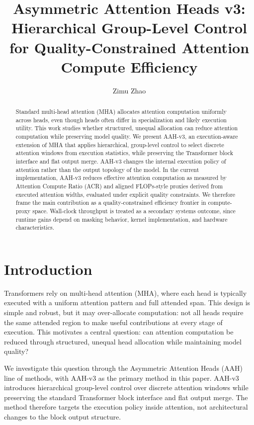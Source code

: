 \documentclass[11pt]{article}
\title{Asymmetric Attention Heads v3: Hierarchical Group-Level Control for Quality-Constrained Attention Compute Efficiency}
\author{Zimu Zhao}
\date{}
\begin{document}
\maketitle



\begin{abstract}
Standard multi-head attention (MHA) allocates attention computation uniformly across heads, even though heads often differ in specialization and likely execution utility. This work studies whether structured, unequal allocation can reduce attention computation while preserving model quality. We present AAH-v3, an execution-aware extension of MHA that applies hierarchical, group-level control to select discrete attention windows from execution statistics, while preserving the Transformer block interface and flat output merge. AAH-v3 changes the internal execution policy of attention rather than the output topology of the model. In the current implementation, AAH-v3 reduces effective attention computation as measured by Attention Compute Ratio (ACR) and aligned FLOPs-style proxies derived from executed attention widths, evaluated under explicit quality constraints. We therefore frame the main contribution as a quality-constrained efficiency frontier in compute-proxy space. Wall-clock throughput is treated as a secondary systems outcome, since runtime gains depend on masking behavior, kernel implementation, and hardware characteristics.


\end{abstract}

\section{Introduction}

Transformers rely on multi-head attention (MHA), where each head is typically executed with a uniform attention pattern and full attended span. This design is simple and robust, but it may over-allocate computation: not all heads require the same attended region to make useful contributions at every stage of execution. This motivates a central question: can attention computation be reduced through structured, unequal head allocation while maintaining model quality?

We investigate this question through the Asymmetric Attention Heads (AAH) line of methods, with AAH-v3 as the primary method in this paper. AAH-v3 introduces hierarchical group-level control over discrete attention windows while preserving the standard Transformer block interface and flat output merge. The method therefore targets the execution policy inside attention, not architectural changes to the block output structure.
\end{document}
